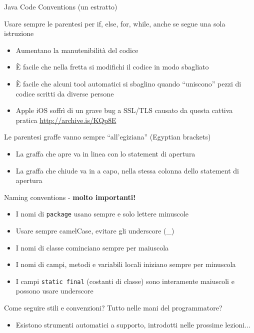 \documentclass[presentation]{beamer}
\begin{document}
\begin{frame}[allowframebreaks]{Java Code Conventions (un estratto)}
	\begin{block}{Usare sempre le parentesi per if, else, for, while, anche se segue una sola istruzione}
		\begin{itemize}
			\item Aumentano la manutenibilità del codice
			\item È facile che nella fretta si modifichi il codice in modo sbagliato
			\item È facile che alcuni tool automatici si sbaglino quando ``uniscono'' pezzi di codice scritti da diverse persone
			\item Apple iOS soffrì di un grave bug a SSL/TLS causato da questa cattiva pratica \url{http://archive.is/KQp8E}
		\end{itemize}
	\end{block}
	\begin{block}{Le parentesi graffe vanno sempre ``all'egiziana'' (Egyptian brackets)}
		\begin{itemize}
			\item La graffa che apre va in linea con lo statement di apertura
			\item La graffa che chiude va in a capo, nella stessa colonna dello statement di apertura
		\end{itemize}
	\end{block}
	\begin{block}{Naming conventions - \textbf{molto importanti!}}
		\begin{itemize}
			\item I nomi di \texttt{package} usano sempre e solo lettere minuscole
			\item Usare sempre camelCase, evitare gli underscore (\_)
			\item I nomi di classe cominciano sempre per maiuscola
			\item I nomi di campi, metodi e variabili locali iniziano sempre per minuscola
			\item I campi \texttt{static final} (costanti di classe) sono interamente maiuscoli e possono usare underscore
		\end{itemize}
	\end{block}
	
Come seguire stili e convenzioni? Tutto nelle mani del programmatore?
\begin{itemize}
\item Esistono strumenti automatici a supporto, introdotti nelle prossime lezioni...
	\end{itemize}
\end{frame}
\end{document}
